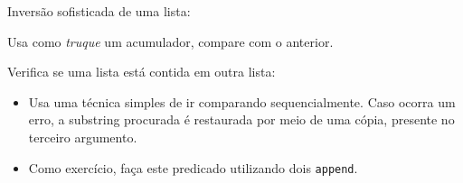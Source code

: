 \documentclass[sans]{beamer}
\begin{document}
\begin{frame}
\begin{block}{Inversão sofisticada de uma lista:}

Usa como\/ {\em truque} \/ um acumulador, compare com o anterior.





\end{block}
\end{frame}


\begin{frame}
\begin{block}{Verifica se uma lista está contida em outra lista:}
\begin{itemize}
 \item Usa uma técnica simples de ir comparando sequencialmente. 
Caso ocorra um erro, a substring procurada é restaurada por meio de uma cópia, presente
no terceiro argumento.



 \item Como exercício, faça este predicado utilizando dois \texttt{append}.
 
\end{itemize}
\end{block}
\end{frame}
\end{document}
